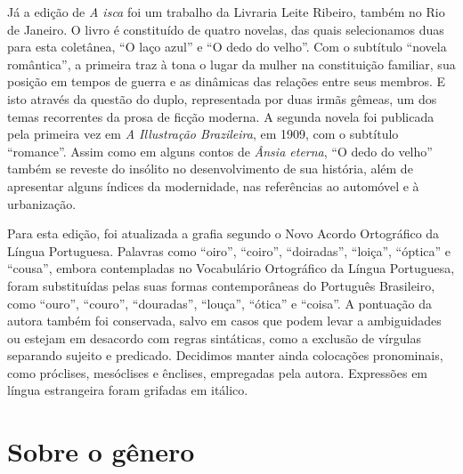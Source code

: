 Já a edição de \emph{A isca} foi um trabalho da Livraria Leite Ribeiro,
também no Rio de Janeiro. O livro é constituído de quatro novelas, das
quais selecionamos duas para esta coletânea, ``O laço azul'' e ``O dedo
do velho''. Com o subtítulo ``novela romântica'', a primeira traz à tona
o lugar da mulher na constituição familiar, sua posição em tempos de
guerra e as dinâmicas das relações entre seus membros. E isto através da
questão do duplo, representada por duas irmãs gêmeas, um dos temas
recorrentes da prosa de ficção moderna. A segunda novela foi publicada
pela primeira vez em \emph{A Illustração Brazileira}, em 1909, com o
subtítulo ``romance''. Assim como em alguns contos de \emph{Ânsia
eterna}, ``O dedo do velho'' também se reveste do insólito no
desenvolvimento de sua história, além de apresentar alguns índices da
modernidade, nas referências ao automóvel e à urbanização.

Para esta edição, foi atualizada a grafia segundo o Novo Acordo
Ortográfico da Língua Portuguesa. Palavras como ``oiro'', ``coiro'',
``doiradas'', ``loiça'', ``óptica'' e ``cousa'', embora contempladas no
Vocabulário Ortográfico da Língua Portuguesa, foram substituídas pelas
suas formas contemporâneas do Português Brasileiro, como ``ouro'',
``couro'', ``douradas'', ``louça'', ``ótica'' e ``coisa''. A pontuação
da autora também foi conservada, salvo em casos que podem levar a
ambiguidades ou estejam em desacordo com regras sintáticas, como a
exclusão de vírgulas separando sujeito e predicado. Decidimos manter
ainda colocações pronominais, como próclises, mesóclises e ênclises,
empregadas pela autora. Expressões em língua estrangeira foram grifadas
em itálico.

\section{Sobre o gênero}